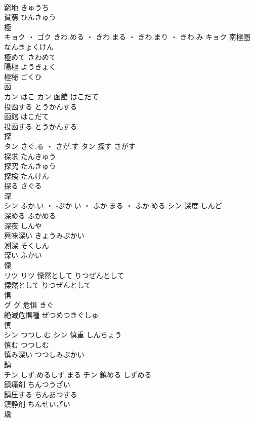 \documentclass[8pt]{extreport}
\begin{document}
\begin{CJK}{UTF8}{min}
\\	窮地	きゅうち	
\\	貧窮	ひんきゅう	
\\	極	
\\	キョク ・ ゴク	きわ.める ・ きわ.まる ・ きわ.まり ・ きわ.み	キョク	南極圏	なんきょくけん	
\\	極めて	きわめて	
\\	陽極	ようきょく	
\\	極秘	ごくひ	
\\	函	
\\	カン	はこ	カン	函館	はこだて	
\\	投函する	とうかんする	
\\	函館	はこだて	
\\	投函する	とうかんする	
\\	探	
\\	タン	さぐ.る ・ さが.す	タン	探す	さがす	
\\	探求	たんきゅう	
\\	探究	たんきゅう	
\\	探検	たんけん	
\\	探る	さぐる	
\\	深	
\\	シン	ふか.い ・ -ぶか.い ・ ふか.まる ・ ふか.める	シン	深度	しんど	
\\	深める	ふかめる	
\\	深夜	しんや	
\\	興味深い	きょうみぶかい	
\\	測深	そくしん	
\\	深い	ふかい	
\\	慄	
\\	リツ		リツ	慄然として	りつぜんとして	
\\	慄然として	りつぜんとして	
\\	惧	
\\	グ		グ	危惧	きぐ	
\\	絶滅危惧種	ぜつめつきぐしゅ	
\\	慎	
\\	シン	つつし.む	シン	慎重	しんちょう	
\\	慎む	つつしむ	
\\	慎み深い	つつしみぶかい	
\\	鎮	
\\	チン	しず.めるしず.まる	チン	鎮める	しずめる	
\\	鎮痛剤	ちんつうざい	
\\	鎮圧する	ちんあつする	
\\	鎮静剤	ちんせいざい	
\\	塡	

\end{CJK}
\end{document}
